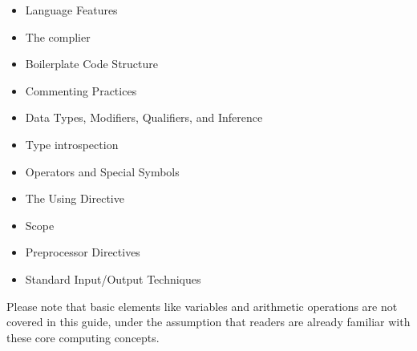 \documentclass{report}
\begin{document}
    \begin{itemize}
        \item Language Features
        \item The complier
        \item Boilerplate Code Structure
        \item Commenting Practices
        \item Data Types, Modifiers, Qualifiers, and Inference
        \item Type introspection
        \item Operators and Special Symbols
        \item The Using Directive
        \item Scope 
        \item Preprocessor Directives
        \item Standard Input/Output Techniques
    \end{itemize}
    \bigbreak \noindent
    Please note that basic elements like variables and arithmetic operations are not covered in this guide, under the assumption that readers are already familiar with these core computing concepts.

    
\end{document}
